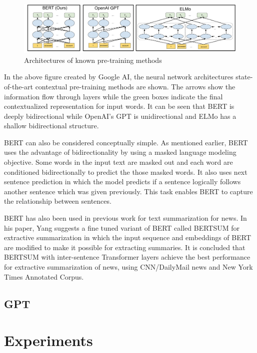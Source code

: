 \documentclass{article}
\begin{document}
\begin{figure}[h]
	\centering
	\includegraphics[scale=0.2]{bert.png}
	\caption{Architectures of known pre-training methods}
	\label{fig:mesh1}
\end{figure}

In the above figure created by Google AI, the neural network architectures state-of-the-art contextual pre-training methods are shown. The arrows show the information flow through layers while the green boxes indicate the final contextualized representation for input words. It can be seen that BERT is deeply bidirectional while OpenAI's GPT is unidirectional and ELMo has a shallow bidirectional structure.

BERT can also be considered conceptually simple. As mentioned earlier, BERT uses the advantage of bidirectionality by using a masked language modeling objective. Some words in the input text are masked out and each word are conditioned bidirectionally to predict the those masked words. It also uses next sentence prediction in which the model predicts if a sentence logically follows another sentence which was given previously. This task enables BERT to capture the relationship between sentences. \cite{devlin2019bert}

BERT has also been used in previous work for text summarization for news. In his paper, Yang suggests a fine tuned variant of BERT called BERTSUM for extractive summarization in which the input sequence and embeddings of BERT are modified to make it possible for extracting summaries. It is concluded that BERTSUM with inter-sentence Transformer layers achieve the best performance for extractive summarization of news, using CNN/DailyMail news and New York Times Annotated Corpus. \cite{liu2019finetune}

\subsection*{GPT}



\section{Experiments}
\end{document}
